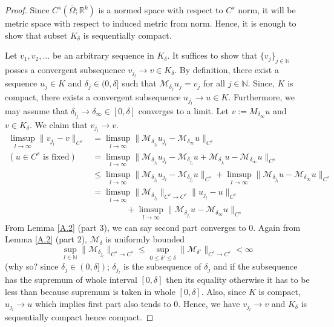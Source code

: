 \documentclass[reqno,9pt]{amsart}
\theoremstyle{plain}
\theoremstyle{definition}
\newcommand{\bb}[1]{\mathbb{#1}}
\newcommand{\cal}[1]{\mathcal{#1}}
\begin{document}
\begin{proof}
    Since $C^s(\overline{\Omega};\mathbb{R}^k)$ is a normed space with respect to $C^s$ norm, it will be metric space with respect to induced metric from norm. Hence, it is enough to show that subset $K_\delta$ is sequentially compact.

    Let $v_1, v_2, \dots$ be an arbitrary sequence in $K_\delta$. It suffices to show that $\{v_j\}_{j \in \bb N}$ posses a convergent subsequence $v_{j_l} \to v \in K_\delta$. By definition, there exist a sequence $u_j \in K$ and $\delta_j \in (0,\delta]$ such that $\cal M_{\delta_j}u_j = v_j$ for all $j \in \bb N$. Since, $K$ is compact, there exists a convergent subsequence $u_{j_l} \to u \in K$. Furthermore, we may assume that $\delta_{l_j} \to \delta_\infty \in [0,\delta]$ converges to a limit. Let $v := M_{\delta_\infty}u$ and $v \in K_\delta$. We claim that $v_{j_l} \to v$. 
    $$ \begin{aligned}
        \limsup\limits_{l \to \infty} \|v_{j_l} - v\|_{C^s} &= \limsup\limits_{l \to \infty} \|\cal M_{\delta_{j_l}}u_{j_l} - \cal M_{\delta_{\infty}}u\|_{C^s}\\
        (\text{$u \in C^s$ is fixed}) &=  \limsup\limits_{l \to \infty} \|\cal M_{\delta_{j_l}}u_{j_l} - \cal M_{\delta_{j_l}}u + \cal M_{\delta_{j_l}}u - \cal M_{\delta_{\infty}}u\|_{C^s} \\
        &\leq \limsup\limits_{l \to \infty} \|\cal M_{\delta_{j_l}}u_{j_l} - \cal M_{\delta_{j_l}}u\|_{C^s} + \limsup\limits_{l \to \infty} \|\cal M_{\delta_{j_l}}u - \cal M_{\delta_{\infty}}u\|_{C^s} \\
        &= \limsup\limits_{l \to \infty} \|\cal M_{\delta_{j_l}}\|_{C^s \to C^s} \|u_{j_l} - u\|_{C^s}\\ &\qquad\qquad+ \limsup\limits_{l \to \infty} \|\cal M_{\delta_{j_l}}u - \cal M_{\delta_{\infty}}u\|_{C^s}
    \end{aligned}
    $$
    From Lemma \ref{A.2} (part $3$), we can say second part converges to $0$. Again from Lemma \ref{A.2} (part $2$), $\cal M_\delta$ is uniformly bounded 
    $$ \sup_{l\in \bb N}\|\cal M_{\delta_{j_l}}\|_{C^s \to C^s} \leq \sup_{0 \leq \delta' \leq \delta}\|\cal M_{\delta'}\|_{C^s \to C^s} < \infty $$ (why so? since $\delta_j \in (0,\delta])$; $\delta_{j_l}$ is the subsequence of $\delta_j$ and if the subsequence has the supremum of whole interval $[0,\delta]$ then its equality otherwise it has to be less than because supremum is taken in whole $[0,\delta]$. Also, since $K$ is compact, $u_{j_l} \to u$ which implies first part also tends to $0$. Hence, we have $v_{j_l} \to v$ and $K_\delta$ is sequentially compact hence compact. 
\end{proof}
\end{document}
